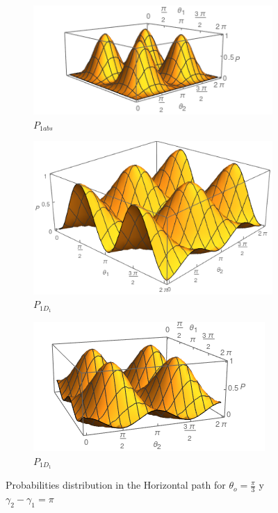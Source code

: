 \documentclass{book}
\begin{document}
\begin{figure}[t!]
\centering
\begin{subfigure}[b]{0.45\linewidth}
\includegraphics[width=\linewidth]{images/P11abs.png}
\caption{$P_{1abs}$}
\label{fig:BS1}
\end{subfigure}
\begin{subfigure}[b]{0.45\linewidth}
\includegraphics[width=\linewidth ,height=3 cm]{images/P11d1.png}
\caption{$P_{1D_{1}}$}
\label{fig:westminster_aerea}
\end{subfigure}
\begin{subfigure}[b]{0.45\linewidth}
\includegraphics[width=\linewidth]{images/P11d2.png}
\caption{$P_{1D_{1}}$}
\label{fig:BS1}
\end{subfigure}
\caption{Probabilities distribution in the Horizontal path for $\theta_{o}=\frac{\pi}{3}$ y $\gamma_{2}-\gamma_{1}=\pi$}
\label{P_bs2}
\end{figure}
\end{document}
